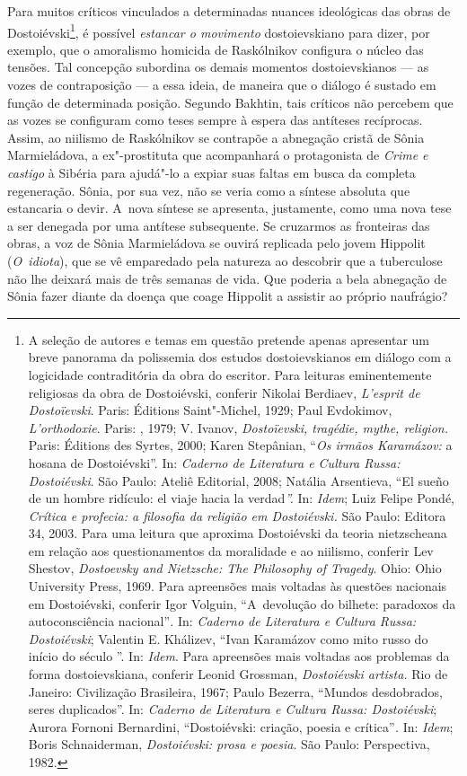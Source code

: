 Para muitos críticos vinculados a determinadas nuances ideológicas das
obras de Dostoiévski\footnote{A seleção de autores e temas em questão
  pretende apenas apresentar um breve panorama da polissemia dos estudos
  dostoievskianos em diálogo com a logicidade contraditória da obra do
  escritor. Para leituras eminentemente religiosas da obra de
  Dostoiévski, conferir Nikolai Berdiaev, \emph{L'esprit de
  Dostoïevski}. Paris: Éditions Saint"-Michel, 1929; Paul Evdokimov,
  \emph{L'orthodoxie}. Paris: , 1979; V. Ivanov, \emph{Dostoïevski,
  tragédie, mythe, religion.} Paris: Éditions des Syrtes, 2000; Karen
  Stepânian, ``\emph{Os irmãos Karamázov:} a hosana de Dostoiévski''.
  In: \emph{Caderno de Literatura e Cultura Russa: Dostoiévski}. São
  Paulo: Ateliê Editorial, 2008; Natália Arsentieva, ``El sueño de un
  hombre ridículo: el viaje hacia la verdad\emph{''.} In: \emph{Idem};
  Luiz Felipe Pondé, \emph{Crítica e profecia: a filosofia da religião
  em Dostoiévski.} São Paulo: Editora 34, 2003. Para uma leitura que
  aproxima Dostoiévski da teoria nietzscheana em relação aos
  questionamentos da moralidade e ao niilismo, conferir Lev Shestov,
  \emph{Dostoevsky and Nietzsche: The Philosophy of Tragedy}. Ohio: Ohio
  University Press, 1969. Para apreensões mais voltadas às questões
  nacionais em Dostoiévski, conferir Igor Volguin, ``A~devolução do
  bilhete: paradoxos da autoconsciência nacional''\emph{.} In:
  \emph{Caderno de Literatura e Cultura Russa: Dostoiévski}; Valentin E.
  Khálizev, ``Ivan Karamázov como mito russo do início do século ''.
  In: \emph{Idem}. Para apreensões mais voltadas aos problemas da forma
  dostoievskiana, conferir Leonid Grossman, \emph{Dostoiévski artista.}
  Rio de Janeiro: Civilização Brasileira, 1967; Paulo Bezerra, ``Mundos
  desdobrados, seres duplicados''. In: \emph{Caderno de Literatura e
  Cultura Russa: Dostoiévski}; Aurora Fornoni Bernardini, ``Dostoiévski:
  criação, poesia e crítica''\emph{.} In: \emph{Idem}; Boris
  Schnaiderman, \emph{Dostoiévski: prosa e poesia}. São Paulo:
  Perspectiva, 1982.}, é possível \emph{estancar o movimento}
dostoievskiano para dizer, por exemplo, que o amoralismo homicida de
Raskólnikov configura o núcleo das tensões. Tal concepção subordina os
demais momentos dostoievskianos --- as vozes de contraposição --- a essa
ideia, de maneira que o diálogo é sustado em função de determinada
posição. Segundo Bakhtin, tais críticos não percebem que as vozes se
configuram como teses sempre à espera das antíteses recíprocas. Assim,
ao niilismo de Raskólnikov se contrapõe a abnegação cristã de Sônia
Marmieládova, a ex"-prostituta que acompanhará o protagonista de
\emph{Crime e castigo} à Sibéria para ajudá"-lo a expiar suas faltas em
busca da completa regeneração. Sônia, por sua vez, não se veria como a
síntese absoluta que estancaria o devir. A~nova síntese se apresenta,
justamente, como uma nova tese a ser denegada por uma antítese
subsequente. Se cruzarmos as fronteiras das obras, a voz de Sônia
Marmieládova se ouvirá replicada pelo jovem Hippolit (\emph{O~idiota}),
que se vê emparedado pela natureza ao descobrir que a tuberculose não
lhe deixará mais de três semanas de vida. Que poderia a bela abnegação
de Sônia fazer diante da doença que coage Hippolit a assistir ao próprio
naufrágio?

